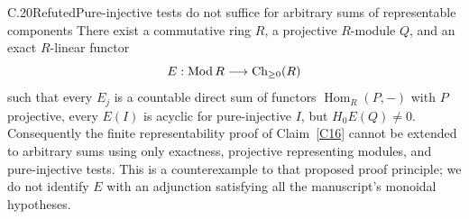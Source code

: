 \begin{claim}{C.20}{Refuted}{Pure-injective tests do not suffice for arbitrary sums of representable components}\label{C20}
There exist a commutative ring $R$, a projective $R$-module $Q$, and an exact $R$-linear functor
\[
 E:\operatorname{Mod} R\longrightarrow\operatorname{Ch}_{\geq0}(R)
\]
such that every $E_j$ is a countable direct sum of functors $\operatorname{Hom}_R(P,-)$ with $P$ projective, every $E(I)$ is acyclic for pure-injective $I$, but $H_0E(Q)\ne0$. Consequently the finite representability proof of Claim~\ref{C16} cannot be extended to arbitrary sums using only exactness, projective representing modules, and pure-injective tests. This is a counterexample to that proposed proof principle; we do not identify $E$ with an adjunction satisfying all the manuscript's monoidal hypotheses.
\end{claim}
